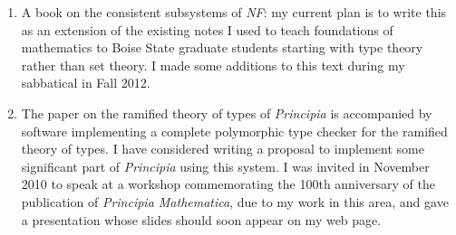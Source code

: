 \begin{description}
\begin{enumerate}
\item A book on the consistent subsystems of {\em NF\/}: my current
plan is to write this as an extension of the existing notes I used to
teach foundations of mathematics to Boise State graduate students
starting with type theory rather than set theory.  I made some additions to this text during my sabbatical in Fall 2012.

\item The paper on the ramified theory of types of {\em Principia\/}
is accompanied by software implementing a complete polymorphic type
checker for the ramified theory of types.  I have considered writing a
proposal to implement some significant part of {\em Principia\/} using
this system.  I was invited in November 2010 to speak at a workshop
commemorating the 100th anniversary of the publication of {\em
Principia Mathematica\/}, due to my work in this area, and gave a
presentation whose slides should soon appear on my web page.

\end{enumerate}

\end{description}





















